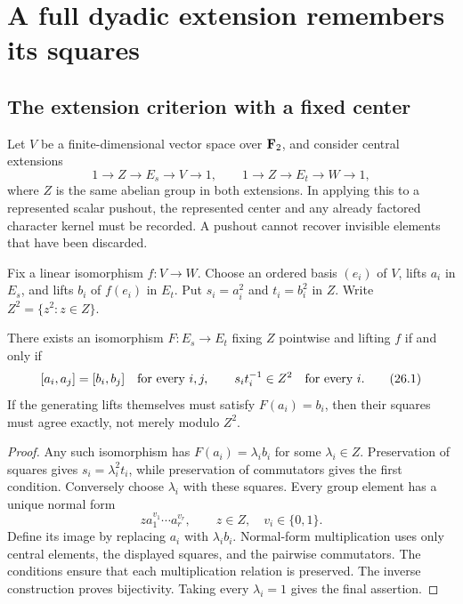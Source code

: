 \section{A full dyadic extension remembers its squares}\label{sec:extensions}
\subsection{The extension criterion with a fixed center}
Let $V$ be a finite-dimensional vector space over $\mathbf F_2$, and consider central extensions
\[
 1\longrightarrow Z\longrightarrow E_s\longrightarrow V\longrightarrow1,
 \qquad
 1\longrightarrow Z\longrightarrow E_t\longrightarrow W\longrightarrow1,
\]
where $Z$ is the same abelian group in both extensions. In applying this to a represented scalar pushout, the represented center and any already factored character kernel must be recorded. A pushout cannot recover invisible elements that have been discarded.

Fix a linear isomorphism $f:V\to W$. Choose an ordered basis $(e_i)$ of $V$, lifts $a_i$ in $E_s$, and lifts $b_i$ of $f(e_i)$ in $E_t$. Put $s_i=a_i^2$ and $t_i=b_i^2$ in $Z$. Write $Z^2=\{z^2:z\in Z\}$.

\begin{proposition}\label{prop:ext}
There exists an isomorphism $F:E_s\to E_t$ fixing $Z$ pointwise and lifting $f$ if and only if
\[
 [a_i,a_j]=[b_i,b_j]\quad\hbox{for every }i,j,
 \qquad s_i t_i^{-1}\in Z^2\quad\hbox{for every }i.
 \tag{26.1}\label{eq:extcrit}
\]
If the generating lifts themselves must satisfy $F(a_i)=b_i$, then their squares must agree exactly, not merely modulo $Z^2$.
\end{proposition}
\begin{proof}
Any such isomorphism has $F(a_i)=\lambda_i b_i$ for some $\lambda_i\in Z$. Preservation of squares gives $s_i=\lambda_i^2 t_i$, while preservation of commutators gives the first condition. Conversely choose $\lambda_i$ with these squares. Every group element has a unique normal form
\[
 z a_1^{v_1}\cdots a_r^{v_r},\qquad z\in Z,\quad v_i\in\{0,1\}.
\]
Define its image by replacing $a_i$ with $\lambda_i b_i$. Normal-form multiplication uses only central elements, the displayed squares, and the pairwise commutators. The conditions ensure that each multiplication relation is preserved. The inverse construction proves bijectivity. Taking every $\lambda_i=1$ gives the final assertion.
\end{proof}

